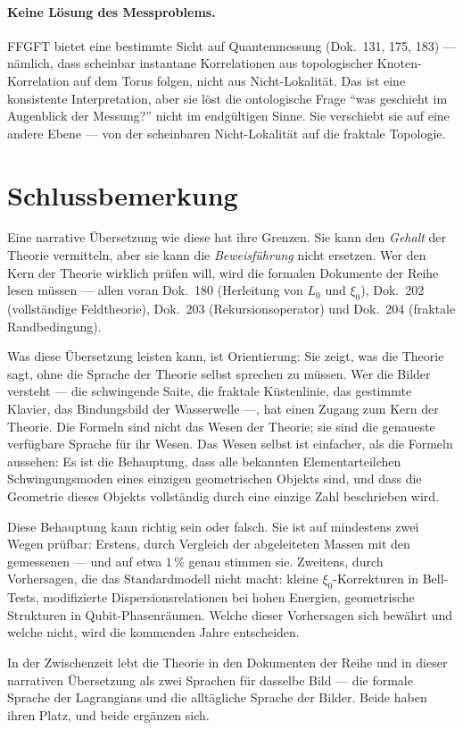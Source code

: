 \paragraph{Keine Lösung des Messproblems.}
FFGFT bietet eine bestimmte Sicht auf Quantenmessung
(Dok.~131, 175, 183) --- nämlich, dass scheinbar instantane
Korrelationen aus topologischer Knoten-Korrelation auf dem Torus
folgen, nicht aus Nicht-Lokalität. Das ist eine konsistente
Interpretation, aber sie löst die ontologische Frage \enquote{was
geschieht im Augenblick der Messung?} nicht im endgültigen Sinne.
Sie verschiebt sie auf eine andere Ebene --- von der scheinbaren
Nicht-Lokalität auf die fraktale Topologie.

\section{Schlussbemerkung}

Eine narrative Übersetzung wie diese hat ihre Grenzen. Sie kann den
\emph{Gehalt} der Theorie vermitteln, aber sie kann die
\emph{Beweisführung} nicht ersetzen. Wer den Kern der Theorie wirklich
prüfen will, wird die formalen Dokumente der Reihe lesen müssen ---
allen voran Dok.~180 (Herleitung von $L_0$ und $\xi_0$), Dok.~202
(vollständige Feldtheorie), Dok.~203 (Rekursionsoperator) und
Dok.~204 (fraktale Randbedingung).

Was diese Übersetzung leisten kann, ist Orientierung: Sie zeigt, was
die Theorie sagt, ohne die Sprache der Theorie selbst sprechen zu
müssen. Wer die Bilder versteht --- die schwingende Saite, die
fraktale Küstenlinie, das gestimmte Klavier, das Bindungsbild der
Wasserwelle ---, hat einen Zugang zum Kern der Theorie. Die Formeln
sind nicht das Wesen der Theorie; sie sind die genaueste verfügbare
Sprache für ihr Wesen. Das Wesen selbst ist einfacher, als die
Formeln aussehen: Es ist die Behauptung, dass alle bekannten
Elementarteilchen Schwingungsmoden eines einzigen geometrischen
Objekts sind, und dass die Geometrie dieses Objekts vollständig
durch eine einzige Zahl beschrieben wird.

Diese Behauptung kann richtig sein oder falsch. Sie ist auf
mindestens zwei Wegen prüfbar: Erstens, durch Vergleich der
abgeleiteten Massen mit den gemessenen --- und auf etwa $1\,\%$
genau stimmen sie. Zweitens, durch Vorhersagen, die das
Standardmodell nicht macht: kleine $\xi_0$-Korrekturen in
Bell-Tests, modifizierte Dispersionsrelationen bei hohen Energien,
geometrische Strukturen in Qubit-Phasenräumen. Welche dieser
Vorhersagen sich bewährt und welche nicht, wird die kommenden Jahre
entscheiden.

In der Zwischenzeit lebt die Theorie in den Dokumenten der Reihe
und in dieser narrativen Übersetzung als zwei Sprachen für dasselbe
Bild --- die formale Sprache der Lagrangians und die alltägliche
Sprache der Bilder. Beide haben ihren Platz, und beide ergänzen
sich.
